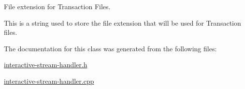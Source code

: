 File extension for Transaction Files. 

This is a string used to store the file extension that will be used for Transaction files. 

The documentation for this class was generated from the following files:\begin{DoxyCompactItemize}
\item 
\hyperlink{interactive-stream-handler_8h}{interactive-\/stream-\/handler.h}\item 
\hyperlink{interactive-stream-handler_8cpp}{interactive-\/stream-\/handler.cpp}\end{DoxyCompactItemize}
